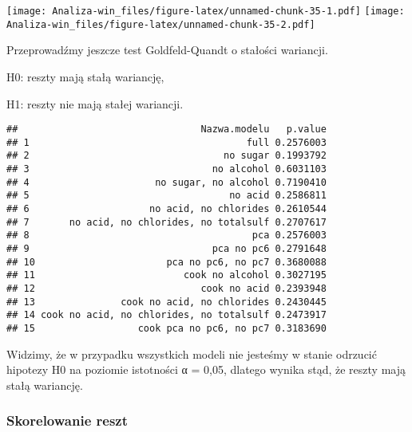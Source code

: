\documentclass[
]{article}
\newenvironment{Shaded}{\begin{snugshade}}{\end{snugshade}}
\newcommand{\ControlFlowTok}[1]{\textcolor[rgb]{0.13,0.29,0.53}{\textbf{#1}}}
\newcommand{\DecValTok}[1]{\textcolor[rgb]{0.00,0.00,0.81}{#1}}
\newcommand{\FunctionTok}[1]{\textcolor[rgb]{0.13,0.29,0.53}{\textbf{#1}}}
\newcommand{\NormalTok}[1]{#1}
\newcommand{\OtherTok}[1]{\textcolor[rgb]{0.56,0.35,0.01}{#1}}
\newcommand{\SpecialCharTok}[1]{\textcolor[rgb]{0.81,0.36,0.00}{\textbf{#1}}}
\newcommand{\StringTok}[1]{\textcolor[rgb]{0.31,0.60,0.02}{#1}}
\begin{document}
\texttt{[image: Analiza-win\_files/figure-latex/unnamed-chunk-35-1.pdf]}
\texttt{[image: Analiza-win\_files/figure-latex/unnamed-chunk-35-2.pdf]}

Przeprowadźmy jeszcze test Goldfeld-Quandt o stałości wariancji.

H0: reszty mają stałą wariancję,

H1: reszty nie mają stałej wariancji.

\begin{Shaded}
\end{Shaded}

\begin{verbatim}
##                                Nazwa.modelu   p.value
## 1                                      full 0.2576003
## 2                                  no sugar 0.1993792
## 3                                no alcohol 0.6031103
## 4                      no sugar, no alcohol 0.7190410
## 5                                   no acid 0.2586811
## 6                     no acid, no chlorides 0.2610544
## 7       no acid, no chlorides, no totalsulf 0.2707617
## 8                                       pca 0.2576003
## 9                                pca no pc6 0.2791648
## 10                       pca no pc6, no pc7 0.3680088
## 11                          cook no alcohol 0.3027195
## 12                             cook no acid 0.2393948
## 13               cook no acid, no chlorides 0.2430445
## 14 cook no acid, no chlorides, no totalsulf 0.2473917
## 15                  cook pca no pc6, no pc7 0.3183690
\end{verbatim}

Widzimy, że w przypadku wszystkich modeli nie jesteśmy w stanie odrzucić
hipotezy H0 na poziomie istotności α = 0,05, dlatego wynika stąd, że
reszty mają stałą wariancję.

\subsubsection{Skorelowanie reszt}\label{skorelowanie-reszt}
\end{document}
